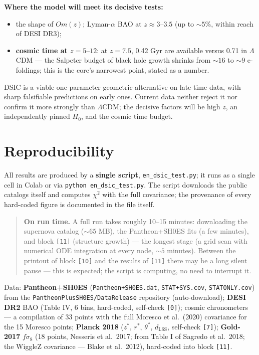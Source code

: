 \documentclass[a4paper,10pt]{article}
\begin{document}
\noindent\textbf{Where the model will meet its decisive tests:}
\begin{itemize}
  \item the shape of $Om(z)$; Lyman-$\alpha$ BAO at $z \approx 3\text{--}3.5$ (up to ${\sim}5\%$, within reach of DESI DR3);
  \item \textbf{cosmic time at $z = 5\text{--}12$}: at $z = 7.5$, 0.42 Gyr are available versus 0.71 in $\Lambda$CDM --- the Salpeter budget of black hole growth shrinks from ${\sim}16$ to ${\sim}9$ e-foldings; this is the core's narrowest point, stated as a number.
\end{itemize}

DSIC is a viable one-parameter geometric alternative on late-time data, with sharp falsifiable predictions on early ones. Current data neither reject it nor confirm it more strongly than $\Lambda$CDM; the decisive factors will be high $z$, an independently pinned $H_0$, and the cosmic time budget.

\section{Reproducibility}

All results are produced by a \textbf{single script}, \texttt{en\_dsic\_test.py}; it runs as a single cell in Colab or via \texttt{python en\_dsic\_test.py}. The script downloads the public catalogs itself and computes $\chi^2$ with the full covariance; the provenance of every hard-coded figure is documented in the file itself.

\begin{quote}
\textbf{On run time.} A full run takes roughly 10--15 minutes: downloading the supernova catalog (${\sim}65$ MB), the Pantheon+SH0ES fits (a few minutes), and block \texttt{[11]} (structure growth) --- the longest stage (a grid scan with numerical ODE integration at every node, ${\sim}5$ minutes). Between the printout of block \texttt{[10]} and the results of \texttt{[11]} there may be a long silent pause --- this is expected; the script is computing, no need to interrupt it.
\end{quote}

Data: \textbf{Pantheon+SH0ES} (\texttt{Pantheon+SH0ES.dat}, \texttt{STAT+SYS.cov}, \texttt{STATONLY.cov}) from the \texttt{PantheonPlusSH0ES/DataRelease} repository (auto-download); \textbf{DESI DR2} BAO (Table IV, 6 bins, hard-coded, self-check \texttt{[0]}); cosmic chronometers --- a compilation of 33 points with the full Moresco et al.\ (2020) covariance for the 15 Moresco points; \textbf{Planck 2018} ($z^*$, $r^*$, $\theta^*$, $d_{\text{LSS}}$, self-check \texttt{[7]}); \textbf{Gold-2017} $f\sigma_8$ (18 points, Nesseris et al.\ 2017; from Table I of Sagredo et al.\ 2018; the WiggleZ covariance --- Blake et al.\ 2012), hard-coded into block \texttt{[11]}.
\end{document}
